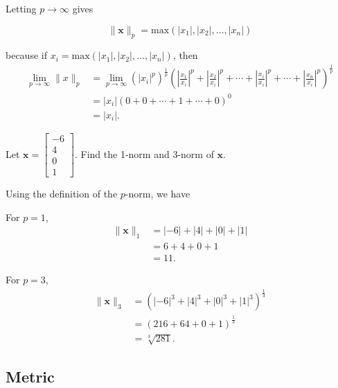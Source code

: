 \begin{example}[\( p \)-norm]
	Letting \( p \to \infty \) gives

	\begin{equation}
		\|\mathbf{x}\|_p = \mathrm{max}(|x_1|, |x_2|, \ldots, |x_n|)
		\label{eq:p-norm-3}
	\end{equation}

	because if \( x_i =  \mathrm{max}(|x_1|, |x_2|, \ldots, |x_n|)\), then
	\begin{align*}
		\lim_{p \to \infty} \|x\|_p & = \lim_{p \to \infty} (|x_i|^p)^{\frac{1}{p}} \left(\left|\frac{x_1}{x_i}\right|^p + \left|\frac{x_2}{x_i}\right|^p + \cdots + \left|\frac{x_i}{x_i}\right|^p + \cdots + \left|\frac{x_n}{x_i}\right|^p\right)^{\frac{1}{p}} \\
		                            & = |x_i| (0 + 0 + \cdots + 1 + \cdots + 0)^0                                                                                                                                                                                  \\
		                            & = |x_i|
		.\end{align*}
\end{example}

\begin{ques}
	Let $\mathbf{x}=\begin{bmatrix}
			-6 \\
			4  \\
			0  \\
			1
		\end{bmatrix}$. Find the 1-norm and 3-norm of $\mathbf{x}$.
\end{ques}
\begin{answer}
	Using the definition of the $p$-norm, we have

	For $p=1$,
	\begin{align*}
		\|\mathbf{x}\|_1
		 & = |-6|+|4|+|0|+|1| \\
		 & = 6+4+0+1          \\
		 & = 11.
	\end{align*}

	For $p=3$,
	\begin{align*}
		\|\mathbf{x}\|_3
		 & = \left(|-6|^3+|4|^3+|0|^3+|1|^3\right)^{\frac{1}{3}} \\
		 & = \left(216+64+0+1\right)^{\frac{1}{3}}               \\
		 & = \sqrt[3]{281}.
	\end{align*}
\end{answer}

\subsection{Metric}

